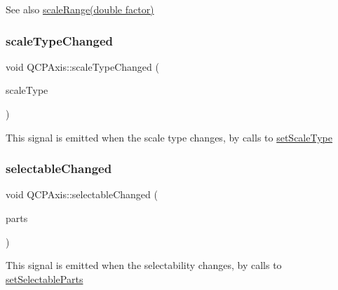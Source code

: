 \begin{DoxySeeAlso}{See also}
\hyperlink{classQCPAxis_a31d18ddf3a4f21ceb077db8ae5b69856}{scale\+Range(double factor)} 
\end{DoxySeeAlso}
\mbox{\label{classQCPAxis_a3505ed8a93bd2e349d858d84996bf767}} 
\subsubsection{\texorpdfstring{scale\+Type\+Changed}{scaleTypeChanged}}
{\footnotesize\ttfamily void Q\+C\+P\+Axis\+::scale\+Type\+Changed (\begin{DoxyParamCaption}\item[{\hyperlink{classQCPAxis_a36d8e8658dbaa179bf2aeb973db2d6f0}{Q\+C\+P\+Axis\+::\+Scale\+Type}}]{scale\+Type }\end{DoxyParamCaption})\hspace{0.3cm}{\ttfamily [signal]}}

This signal is emitted when the scale type changes, by calls to \hyperlink{classQCPAxis_adef29cae617af4f519f6c40d1a866ca6}{set\+Scale\+Type} \mbox{\label{classQCPAxis_aa5ff1fd851139028a3bb4efcb31de9fc}} 
\subsubsection{\texorpdfstring{selectable\+Changed}{selectableChanged}}
{\footnotesize\ttfamily void Q\+C\+P\+Axis\+::selectable\+Changed (\begin{DoxyParamCaption}\item[{const Q\+C\+P\+Axis\+::\+Selectable\+Parts \&}]{parts }\end{DoxyParamCaption})\hspace{0.3cm}{\ttfamily [signal]}}

This signal is emitted when the selectability changes, by calls to \hyperlink{classQCPAxis_a513f9b9e326c505d9bec54880031b085}{set\+Selectable\+Parts} \mbox{\label{classQCPAxis_a62b598abeee7174a05f9d542cc85b1f5}} 
